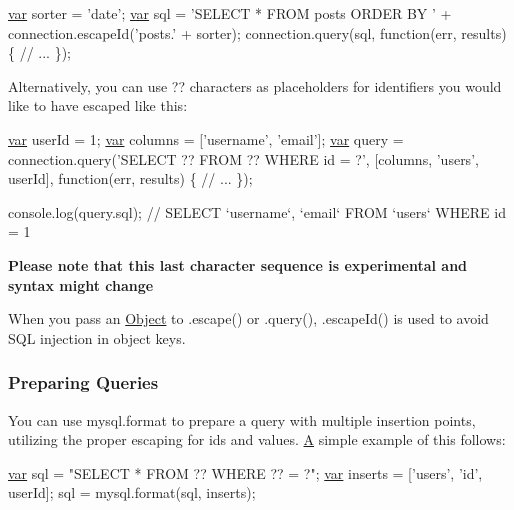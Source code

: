 \begin{DoxyCode}
\hyperlink{018__def_8c_a335628f2e9085305224b4f9cc6e95ed5}{var} sorter = \textcolor{stringliteral}{'date'};
\hyperlink{018__def_8c_a335628f2e9085305224b4f9cc6e95ed5}{var} sql    = \textcolor{stringliteral}{'SELECT * FROM posts ORDER BY '} + connection.escapeId(\textcolor{stringliteral}{'posts.'} + sorter);
connection.query(sql, \textcolor{keyword}{function}(err, results) \{
  \textcolor{comment}{// ...}
\});
\end{DoxyCode}


Alternatively, you can use {\ttfamily ??} characters as placeholders for identifiers you would like to have escaped like this\+:


\begin{DoxyCode}
\hyperlink{018__def_8c_a335628f2e9085305224b4f9cc6e95ed5}{var} userId = 1;
\hyperlink{018__def_8c_a335628f2e9085305224b4f9cc6e95ed5}{var} columns = [\textcolor{stringliteral}{'username'}, \textcolor{stringliteral}{'email'}];
\hyperlink{018__def_8c_a335628f2e9085305224b4f9cc6e95ed5}{var} query = connection.query(\textcolor{stringliteral}{'SELECT ?? FROM ?? WHERE id = ?'}, [columns, \textcolor{stringliteral}{'users'}, userId], \textcolor{keyword}{function}(err,
       results) \{
  \textcolor{comment}{// ...}
\});

console.log(query.sql); \textcolor{comment}{// SELECT `username`, `email` FROM `users` WHERE id = 1}
\end{DoxyCode}
 {\bfseries Please note that this last character sequence is experimental and syntax might change}

When you pass an \hyperlink{struct_object}{Object} to {\ttfamily .escape()} or {\ttfamily .query()}, {\ttfamily .escape\+Id()} is used to avoid S\+Q\+L injection in object keys.

\subsubsection*{Preparing Queries}

You can use mysql.\+format to prepare a query with multiple insertion points, utilizing the proper escaping for ids and values. \hyperlink{class_a}{A} simple example of this follows\+:


\begin{DoxyCode}
\hyperlink{018__def_8c_a335628f2e9085305224b4f9cc6e95ed5}{var} sql = \textcolor{stringliteral}{"SELECT * FROM ?? WHERE ?? = ?"};
\hyperlink{018__def_8c_a335628f2e9085305224b4f9cc6e95ed5}{var} inserts = [\textcolor{stringliteral}{'users'}, \textcolor{stringliteral}{'id'}, userId];
sql = mysql.format(sql, inserts);
\end{DoxyCode}


